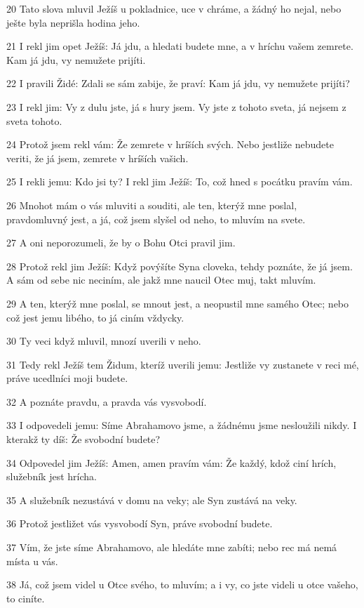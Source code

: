\par 20 Tato slova mluvil Ježíš u pokladnice, uce v chráme, a žádný ho nejal, nebo ješte byla neprišla hodina jeho.
\par 21 I rekl jim opet Ježíš: Já jdu, a hledati budete mne, a v hríchu vašem zemrete. Kam já jdu, vy nemužete prijíti.
\par 22 I pravili Židé: Zdali se sám zabije, že praví: Kam já jdu, vy nemužete prijíti?
\par 23 I rekl jim: Vy z dulu jste, já s hury jsem. Vy jste z tohoto sveta, já nejsem z sveta tohoto.
\par 24 Protož jsem rekl vám: Že zemrete v hríších svých. Nebo jestliže nebudete veriti, že já jsem, zemrete v hríších vašich.
\par 25 I rekli jemu: Kdo jsi ty? I rekl jim Ježíš: To, což hned s pocátku pravím vám.
\par 26 Mnohot mám o vás mluviti a souditi, ale ten, kterýž mne poslal, pravdomluvný jest, a já, což jsem slyšel od neho, to mluvím na svete.
\par 27 A oni neporozumeli, že by o Bohu Otci pravil jim.
\par 28 Protož rekl jim Ježíš: Když povýšíte Syna cloveka, tehdy poznáte, že já jsem. A sám od sebe nic neciním, ale jakž mne naucil Otec muj, takt mluvím.
\par 29 A ten, kterýž mne poslal, se mnout jest, a neopustil mne samého Otec; nebo což jest jemu libého, to já ciním vždycky.
\par 30 Ty veci když mluvil, mnozí uverili v neho.
\par 31 Tedy rekl Ježíš tem Židum, kteríž uverili jemu: Jestliže vy zustanete v reci mé, práve ucedlníci moji budete.
\par 32 A poznáte pravdu, a pravda vás vysvobodí.
\par 33 I odpovedeli jemu: Síme Abrahamovo jsme, a žádnému jsme nesloužili nikdy. I kterakž ty díš: Že svobodní budete?
\par 34 Odpovedel jim Ježíš: Amen, amen pravím vám: Že každý, kdož ciní hrích, služebník jest hrícha.
\par 35 A služebník nezustává v domu na veky; ale Syn zustává na veky.
\par 36 Protož jestližet vás vysvobodí Syn, práve svobodní budete.
\par 37 Vím, že jste síme Abrahamovo, ale hledáte mne zabíti; nebo rec má nemá místa u vás.
\par 38 Já, což jsem videl u Otce svého, to mluvím; a i vy, co jste videli u otce vašeho, to ciníte.
